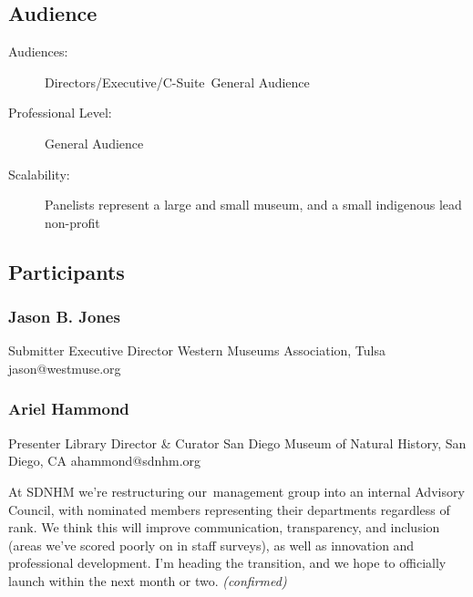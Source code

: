 \documentclass{report}
\begin{document}
              \subsection*{Audience}
                \begin{description}
                  \item [Audiences:]Directors/Executive/C-Suite~General Audience~
                  \item[Professional Level:]General Audience~
                \item[Scalability:] Panelists represent a large and small museum, and a small indigenous lead non-profit

							
              \end{description}
            \subsection*{Participants}
              \subsubsection*{ Jason B. Jones }
              Submitter\newline
              Executive Director\newline
              Western Museums Association, Tulsa
              \newline
              jason@westmuse.org\newline
              
              

              


              

              
                \subsubsection*{   Ariel  Hammond  }
                Presenter\newline
                Library Director \& Curator\newline
                San Diego Museum of Natural History, San Diego, CA
                \newline
                ahammond@sdnhm.org\newline
                
                

                At SDNHM we're restructuring our management group into an internal Advisory Council, with nominated members representing their departments regardless of rank. We think this will improve communication, transparency, and inclusion (areas we've scored poorly on in staff surveys), as well as innovation and professional development. I'm heading the transition, and we hope to officially launch within the next month or two.
                \emph{ (confirmed) }
              
\end{document}
